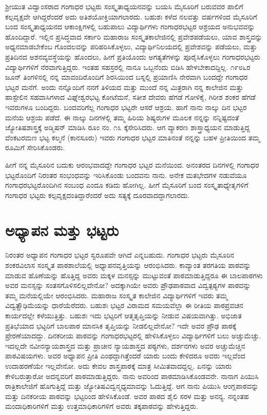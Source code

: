 {ಶ್ರೀಯುತ ವಿದ್ವಾಂಸರಾದ ಗಂಗಾಧರ ಭಟ್ಟರು ಸಂಸ್ಕೃತಾಧ್ಯಯನವನ್ನು ಬಯಸಿ ಮೈಸೂರಿಗೆ ಬರುವವರ ಪಾಲಿಗೆ ಕಲ್ಪವೃಕ್ಷವೇ ಆಗಿದ್ದರೆಂದರೆ ಅದು ಅತಿಶಯೋಕ್ತಿ\-ಯಾಗಲಾರದು. ಬಹುಶಃ ಕಳೆದ ನಲವತ್ತು ವರ್ಷಗಳಿಂದ ಮೈಸೂರಿಗೆ ಬಂದ ಸಂಸ್ಕೃತಾ\-ಧ್ಯಯನದ ಆಕಾಂಕ್ಷಿಗಳಲ್ಲಿ ಬಹುಪಾಲು ವಿದ್ಯಾರ್ಥಿಗಳು ಗಂಗಾಧರಭಟ್ಟರ ಆಶ್ರಯದ ಅನುಭವ\-ವನ್ನು ಹೊಂದಿದ್ದಾರೆ. ಇಲ್ಲಿನ ಪ್ರಸಿದ್ಧವಾದ ಸರ್ಕಾರಿ ಮಹಾರಾಜ ಸಂಸ್ಕೃತ\-ಕಾಲೇಜಿನಲ್ಲಿ ಪ್ರವೇಶಪಡೆಯಲು, ಯಾವ ಶಾಸ್ತ್ರವನ್ನು ಅಧ್ಯನಮಾಡ\-ಬೇಕೆಂಬ ಗೊಂದಲ\-ವನ್ನು ಪರಿಹರಿಸಿಕೊಳ್ಳಲು, ವಿದ್ಯಾರ್ಥಿನಿಲಯದಲ್ಲಿ ಪ್ರವೇಶವನ್ನು ಪಡೆಯಲು, ಮತ್ತು ಪ್ರತಿದಿನದ ಅಶನವ್ಯವಸ್ಥೆಯನ್ನು ಹೊಂದಲು, ಹೀಗೆ ಪ್ರತಿಯೊಂದು ಅಗತ್ಯತೆಗಳನ್ನು ಪೂರೈಸಿಕೊಳ್ಳಲು ಗಂಗಾಧರಭಟ್ಟರು ವಿದ್ಯಾರ್ಥಿಗಳಿಗೆ ನೆರವಾಗುತ್ತಿದ್ದರು. ಇಂತಹ ಸಹಸ್ರರಲ್ಲಿ ನಾನೂ ಒಬ್ಬನೆಂದು ಬಿಡಿಸಿ ಹೇಳಬೇಕಾದದ್ದಿಲ್ಲ. ೧೯೮೬ರ ಜೂನ್ ತಿಂಗಳಿನಲ್ಲಿ ನನ್ನ ಮಾವಂದಿರೊಂದಿಗೆ ಶಿರಸಿಯಿಂದ ಬಸ್ನಲ್ಲಿ ಪ್ರಯಾಣಿಸಿ ನೇರವಾಗಿ ಬಂದದ್ದೇ ಗಂಗಾಧರ ಭಟ್ಟರ ಮನೆಗೆ. ಅಂದು ನನ್ನೊಂದಿಗೆ ನನಗೆ ತಿಳಿಯದ ಮತ್ತು ಮುಂದೆ ನನ್ನ ಮಿತ್ರರಾಗಿ ನನ್ನ ಕಾಲೇಜಿನ ಮತ್ತು ಹಾಸ್ಟೇಲಿನ ಸಹವಾಸಿಗಳಾದ ವಿಘ್ನೇಶ್ವರಭಟ್ಟ ಕೋಟೆಮನೆ, ಸತೀಶ ದೇವರು ಹೆಗಡೆ ಗೋಳಿಕೈ, ಗಿರೀಶ ಶಂಕರ ಹೆಗಡೆ ಇವರುಗಳೂ ಬಂದಿದ್ದರು. ಬಂದವರಿಗೆಲ್ಲ ಗಂಗಾಧರ ಭಟ್ಟರೇ ಆಸರೆ  \enginline{-}  ಆಶ್ರಯ. ಹಾಗೆ ನಾನು ನಾಲ್ಕು ದಿನ ಭಟ್ಟರ ಮನೆಯ ಆಶ್ರಯ ಪಡೆದೆ. ಈ ನಾಲ್ಕು ದಿನಗಳಲ್ಲಿ ತಮ್ಮ ಹಿರಿಯ ಶಿಷ್ಯರುಗಳ ಮೂಲಕ ನನ್ನನ್ನು ನನ್ನಿಷ್ಟದಂತೆ ಜ್ಯೋತಿಷಶಾಸ್ತ್ರಕ್ಕೆ ಅಡ್ಮಿಷನ್ ಮಾಡಿಸಿ ರೂಂ ನಂ. ೧೩ ಕ್ಕೆಸೇರಿಸಿದರು. ಆಗ ವ್ಯಾಕರಣ ಶಾಸ್ತ್ರಾಧ್ಯಯನ ಮಾಡುತ್ತಿದ್ದ ವೆಂಕಟರಮಣ ಭಟ್ಟ ಕಲ್ಮನೆ (ಕಾನಸೂರು) ಇವರು ಗಂಗಾಧರ ಭಟ್ಟರ ಮಾತಿನಂತೆ ನನ್ನನ್ನು ಬಹಳ ಪ್ರೀತಿಯಿಂದ ತಮ್ಮ ರೂಮಿಗೆ ಸೇರಿಸಿಕೊಂಡರು. 

ಹೀಗೆ ನನ್ನ ಮೈಸೂರಿನ ಬದುಕು ಆರಂಭವಾದದ್ದೇ ಗಂಗಾಧರ ಭಟ್ಟರ ಮನೆಯಿಂದ. ಅನಂತರದ ದಿನಗಳಲ್ಲಿ ಗಂಗಾಧರ ಭಟ್ಟರೊಂದಿಗೆ ನಿರಂತರ ಸಂಭಂಧವನ್ನು ಇರಿಸಿಕೊಂಡು ಬಂದವನು ನಾನು. ಅನೇಕ ಮತಭೇದಗಳ ನಡುವೆಯೂ ಗಂಗಾಧರ\-ಭಟ್ಟರೊಂದಿಗಿನ ಸಂಬಂಧ ಎಂದೂ ಕಡಿದು ಹೋಗಿಲ್ಲ. ಹೀಗೆ ಮೈಸೂರಿಗೆ ಬಂದ ಸಂಸ್ಕೃತಾ\-ಧ್ಯೇತೃಗಳಿಗೆ ಗಂಗಾಧರ ಭಟ್ಟರು ಕಲ್ಪವೃಕ್ಷದಂತಿದ್ದಾರೆಂದರೆ ಅದು ಸತ್ಯಕ್ಕೆ ದೂರವಾದದ್ದಾಗಲಾರದು.

\section*{ಅಧ್ಯಾಪನ ಮತ್ತು ಭಟ್ಟರು}

ನಿರಂತರ ಅಧ್ಯಾಪನ ಗಂಗಾಧರ ಭಟ್ಟರ ಸ್ವರೂಪವೇ ಆಗಿದೆ ಎನ್ನಬಹುದು. ಗಂಗಾಧರ ಭಟ್ಟರು ಮೈಸೂರಿನ ಶಂಕರವಿಲಾಸ ಸಂಸ್ಕೃತ ಪಾಠಶಾಲೆಯಲ್ಲಿ ಅಧ್ಯಾಪನವೃತ್ತಿಯನ್ನು ಆರಂಭಿಸಿದರು. ಕಾವ್ಯಾಂತ ತರಗತಿಯ ಪಾಠವನ್ನು ಮಾಡುವ ಹೊಣೆಯನ್ನು ಹೊತ್ತಿದ್ದ ಅವರು ಮಕ್ಕಳ ಮನಸ್ಸನ್ನು ಮುಟ್ಟುವಂತೆ ಪಾಠಮಾಡುತ್ತಿದ್ದರೂ ಈ ಬಾಲ\-ಪಾಠಗಳು ಅವರ ಮನಸ್ಸನ್ನು ಸಂತಸಗೊಳಿಸಲಿಲ್ಲವೇನೋ? ಅದಕ್ಕಾಗಿಯೇ ಅವರು ಪ್ರೌಢ\-ಪಾಠವಾದ ವಿದ್ವತ್ಪಠ್ಯಗಳ ಪಾಠವನ್ನು ತಮ್ಮ ಮನೆಯಲ್ಲಿಯೇ ಆರಂಭಿಸಿದರು. ಮಹಾರಾಜ ಸಂಸ್ಕೃತ ಕಾಲೇಜಿನ ವಿದ್ಯಾರ್ಥಿಗಳಿಗೆ ಇವರು ತಮ್ಮ ವಿದ್ವತ್ಪ್ರೌಢಿಮೆಯನ್ನು ಧಾರೆ\-ಯೆರೆದರು. ಬಹುಶಃ ಭಟ್ಟರ ವಿರಾಮದ ಸಮಯವೆಲ್ಲಾ ಈ ರೀತಿಯ ಪಾಠ\-ಪ್ರವಚನ ಕಾರ್ಯದಲ್ಲೇ ಕಳೆಯುತ್ತಿತ್ತು. ಬಹುಶಃ ಇದು ಭಟ್ಟರಿಗೆ ಆತ್ಮತೃಪ್ತಿಯನ್ನು ನೀಡುವ ವಿಷಯವಾಗಿತ್ತು. ಅಭಿಜಾತ ಪ್ರತಿಭೆಯಾದ ಭಟ್ಟರಿಗೆ ಬಾಲಪಾಠ ಮಾನಸಿಕ ತೃಪ್ತಿಯನ್ನು ನೀಡಲಿಲ್ಲವೇನೋ? ಇದೇ ಅವರ ಪ್ರೌಢ ಪಾಠಕ್ಕೆ  ಪ್ರೇರಣೆಯಾದದ್ದು. ದಿನಕರೀಯ ಪಾಠವನ್ನು ಗಂಗಾಧರಭಟ್ಟರಲ್ಲಿ ಹೇಳಿಸಿಕೊಳ್ಳಲು ವಿದ್ಯಾರ್ಥಿ\-ಗಳಿಗೆ ಬಲು ಅಚ್ಚುಮೆಚ್ಚು. ಇದಲ್ಲದೇ ನವೀನನ್ಯಾಯಶಾಸ್ತ್ರದ ಮತ್ತು ಪ್ರಾಚೀನ ನ್ಯಾಯಶಾಸ್ತ್ರದ ಪಠ್ಯಗಳು, ದರ್ಶನಗಳು ಅವರ ಅಚ್ಚುಮೆಚ್ಚಿನ ಪಾಠವಿಷಯಗಳು. ಅವರ ಅಧ್ಯಾಪನ ಪ್ರೀತಿ ಎಂಥದ್ದಾಗಿತ್ತೆಂದರೆ ಯಾರು ಬಂದು ಕೇಳಿದರೂ ಅವರು ಇಲ್ಲವೆಂದ ಉದಾಹರಣೆಯೇ ಇಲ್ಲವೇನೋ. ಅದು ಕೇವಲ ಶಾಸ್ತ್ರಪಾಠಕ್ಕೆ ಮಾತ್ರ ಸೀಮಿತವಾದದ್ದಲ್ಲ. ಏನನ್ನು ಯಾರು ಕೇಳಿಬರುತ್ತಾರೋ ಅದನ್ನವರಿಗೆ ಪಾಠಮಾಡುತ್ತಿದ್ದರು. ನಾನು ಅವರಿಂದ ಪಾಠಮಾಡಿಸಿಕೊಂಡವನೇ. ನಾನಾಗ ಪಿಯುಸಿ ರಾತ್ರಿಕಾಲೇಜಿಗೆ ಹೊಗುತ್ತಿದ್ದೆ ಮತ್ತು ಜ್ಯೋತಿಷ\-ವಿದ್ವನ್ಮಧ್ಯಮಾವನ್ನು ಓದುತ್ತಿದ್ದೆ. ಆಗ ನಾನು ಪಿಯುಸಿ ಆಂಗ್ಲಪಾಠವನ್ನು ಮತ್ತು ದಿನಕರೀಯ ಪಾಠವನ್ನು ಭಟ್ಟರಿಂದ ಹೇಳಿಸಿಕೊಂಡೆ. ಅವರ ಪಾಠದ ಶೈಲಿ ಸರಳ ಮತ್ತು ಅನನ್ಯ. ನನ್ನಂತಹ ಮಂದಾಧಿಕಾರಿಗಳಿಗೆ ಮತ್ತು ಉತ್ತಮಾಧಿಕಾರಿಗಳಿಗೆ ಅವರು ತಕ್ಕಪಾಠವನ್ನು ಹೇಳುತ್ತಿದ್ದರು.

}
